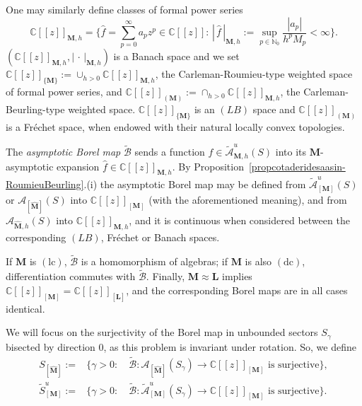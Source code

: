 \documentclass[11pt,a4paper]{article}
\theoremstyle{plain}
\theoremstyle{definition}
\numberwithin{equation}{section}
\newcommand{\N}{\mathbb{N}}
\newcommand{\C}{\mathbb{C}}
\newcommand{\bL}{{\boldsymbol{L}}}
\newcommand{\M}{{\boldsymbol{M}}}
\newcommand{\hM}{\widehat{{\boldsymbol{M}}}}
\newcommand{\lc}{\operatorname{(lc)}}
\newcommand{\dc}{\operatorname{(dc)}}
\begin{document}
One may similarly define classes of formal power series
\begin{equation}\label{eq.defBanachFormalPowerSeries}
\C[[z]]_{\M,h}=\Big\{\widehat{f}=\sum_{p=0}^\infty a_pz^p\in\C[[z]]:\, \left|\,\widehat{f} \,\right|_{\M,h}:=\sup_{p\in\N_{0}}\displaystyle \frac{|a_{p}|}{h^{p}M_{p}}<\infty\Big\}.
\end{equation}%
$(\C[[z]]_{\M,h},\left| \,\cdot\,  \right|_{\M,h})$ is a Banach space and we set $\C[[z]]_{\{\M\}}:=\cup_{h>0}\C[[z]]_{\M,h}$, the Carleman-Roumieu-type weighted space of formal power series, and $\C[[z]]_{(\M)}:=\cap_{h>0}\C[[z]]_{\M,h}$, the Carleman-Beurling-type weighted space.
$\C[[z]]_{\{\M\}}$ is an $(LB)$ space and $\C[[z]]_{(\M)}$ is a Fr\'echet space, when endowed with their natural locally convex topologies.

The \emph{asymptotic Borel map}  $\widetilde{\mathcal{B}}$
sends a function $f\in\widetilde{\mathcal{A}}^u_{\M,h}(S)$
into its $\M$-asymptotic expansion $\widehat{f}\in\C[[z]]_{\M,h}$.
By Proposition~\ref{propcotaderidesaasin-RoumieuBeurling}.(i)
the asymptotic Borel map may be defined from $\widetilde{\mathcal{A}}^u_{[\M]}(S)$ or $\mathcal{A}_{[\hM]}(S)$ into  $\C[[z]]_{[\M]}$ (with the aforementioned meaning), and from $\mathcal{A}_{\hM,h}(S)$ into $\C[[z]]_{\M,h}$, and it is continuous when considered between the corresponding $(LB)$, Fr\'echet or Banach spaces.

If $\M$ is $\lc$, $\widetilde{\mathcal{B}}$ is a homomorphism of algebras; if $\M$ is also $\dc$, differentiation commutes with $\widetilde{\mathcal{B}}$. Finally, $\M\approx\bL$ implies $\C[[z]]_{[\M]}=\C[[z]]_{[\bL]}$, and the corresponding Borel maps are in all cases identical.

We will focus on the surjectivity of the Borel map in unbounded sectors $S_{\gamma}$ bisected by direction 0, as this problem is invariant under rotation. So, we define
\begin{align*}
S_{[\hM]}:=&\{\gamma>0\colon \quad \widetilde{\mathcal{B}}:\mathcal{A}_{[\hM]}(S_\gamma)\longrightarrow \C[[z]]_{[\M]} \text{ is surjective}\} ,\\
\widetilde{S}^u_{[\M]}:=&\{\gamma>0\colon \quad\widetilde{\mathcal{B}}:\widetilde{\mathcal{A}}^u_{[\M]}(S_\gamma)\longrightarrow \C[[z]]_{[\M]} \text{ is surjective}\}.
\end{align*}
\end{document}
